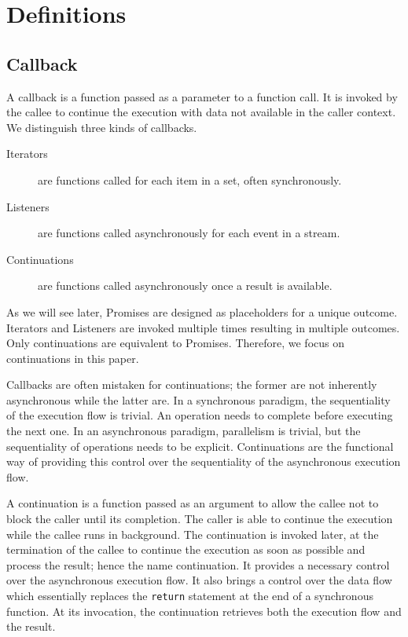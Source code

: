\section{Definitions} \label{section:definitions}

\subsection{Callback} \label{section:definitions:continuation}

A callback is a function passed as a parameter to a function call.
It is invoked by the callee to continue the execution with data not available in the caller context.
We distinguish three kinds of callbacks.

\begin{description}
  \item[Iterators] are functions called for each item in a set, often synchronously.
  \item[Listeners] are functions called asynchronously for each event in a stream.
  \item[Continuations] are functions called asynchronously once a result is available.
\end{description}

As we will see later, Promises are designed as placeholders for a unique outcome.
Iterators and Listeners are invoked multiple times resulting in multiple outcomes.
Only continuations are equivalent to Promises.
Therefore, we focus on continuations in this paper.

Callbacks are often mistaken for continuations; the former are not inherently asynchronous while the latter are.
In a synchronous paradigm, the sequentiality of the execution flow is trivial.
An operation needs to complete before executing the next one.
In an asynchronous paradigm, parallelism is trivial, but the sequentiality of operations needs to be explicit.
Continuations are the functional way of providing this control over the sequentiality of the asynchronous execution flow.

A continuation is a function passed as an argument to allow the callee not to block the caller until its completion.
The caller is able to continue the execution while the callee runs in background.
The continuation is invoked later, at the termination of the callee to continue the execution as soon as possible and process the result; hence the name continuation.
It provides a necessary control over the asynchronous execution flow.
It also brings a control over the data flow which essentially replaces the \texttt{return} statement at the end of a synchronous function.
At its invocation, the continuation retrieves both the execution flow and the result.

